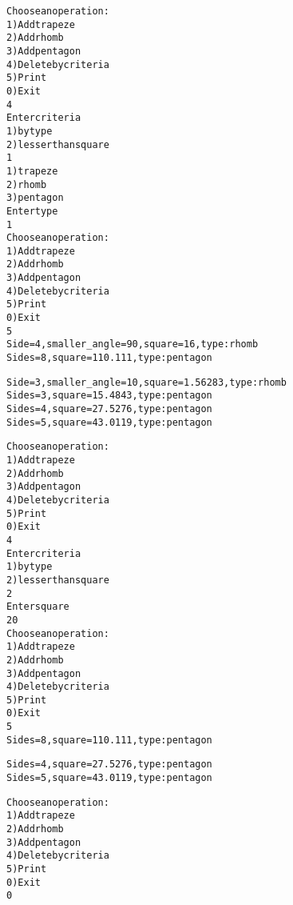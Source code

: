 \begin{alltt}
Choose an operation:
1) Add trapeze
2) Add rhomb
3) Add pentagon
4) Delete by criteria
5) Print
0) Exit
4
Enter criteria
1) by type
2) lesser than square
1
1) trapeze
2) rhomb
3) pentagon
Enter type
1
Choose an operation:
1) Add trapeze
2) Add rhomb
3) Add pentagon
4) Delete by criteria
5) Print
0) Exit
5
Side = 4, smaller_angle = 90, square = 16, type: rhomb
Sides =  8, square = 110.111, type: pentagon

Side = 3, smaller_angle = 10, square = 1.56283, type: rhomb
Sides =  3, square = 15.4843, type: pentagon
Sides =  4, square = 27.5276, type: pentagon
Sides =  5, square = 43.0119, type: pentagon

Choose an operation:
1) Add trapeze
2) Add rhomb
3) Add pentagon
4) Delete by criteria
5) Print
0) Exit
4
Enter criteria
1) by type
2) lesser than square
2
Enter square
20
Choose an operation:
1) Add trapeze
2) Add rhomb
3) Add pentagon
4) Delete by criteria
5) Print
0) Exit
5
Sides =  8, square = 110.111, type: pentagon

Sides =  4, square = 27.5276, type: pentagon
Sides =  5, square = 43.0119, type: pentagon

Choose an operation:
1) Add trapeze
2) Add rhomb
3) Add pentagon
4) Delete by criteria
5) Print
0) Exit
0

\end{alltt}

